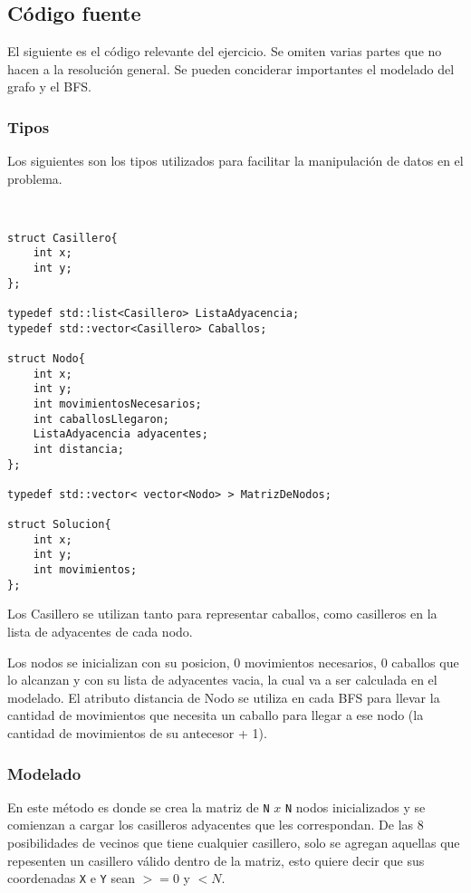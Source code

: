 \subsection{C\'odigo fuente}

El siguiente es el c\'odigo relevante del ejercicio. Se omiten varias partes que no hacen a la resoluci\'on general. Se pueden conciderar importantes el modelado del grafo y el BFS.

\subsubsection{Tipos}
Los siguientes son los tipos utilizados para facilitar la manipulaci\'on de datos en el problema.

\begin{lstlisting}


struct Casillero{
	int x;
	int y;
};

typedef std::list<Casillero> ListaAdyacencia;
typedef std::vector<Casillero> Caballos;

struct Nodo{
	int x;
	int y;
	int movimientosNecesarios;
	int caballosLlegaron;
	ListaAdyacencia adyacentes;
	int distancia;
};

typedef std::vector< vector<Nodo> > MatrizDeNodos;

struct Solucion{
	int x;
	int y;
	int movimientos;
};

\end{lstlisting}

Los Casillero se utilizan tanto para representar caballos, como casilleros en la lista de adyacentes de cada nodo.

Los nodos se inicializan con su posicion, 0 movimientos necesarios, 0 caballos que lo alcanzan y con su lista de adyacentes vacia, la cual va a ser calculada en el modelado. El atributo distancia de Nodo se utiliza en cada BFS para llevar la cantidad de movimientos que necesita un caballo para llegar a ese nodo (la cantidad de movimientos de su antecesor + 1).

\subsubsection{Modelado}

En este m\'etodo es donde se crea la matriz de \texttt{N} $x$ \texttt{N} nodos inicializados y se comienzan a cargar los casilleros adyacentes que les correspondan.
De las 8 posibilidades de vecinos que tiene cualquier casillero, solo se agregan aquellas que repesenten un casillero v\'alido dentro de la matriz, esto quiere decir que sus coordenadas \texttt{X} e \texttt{Y} sean $>= 0$ y $< N$.

